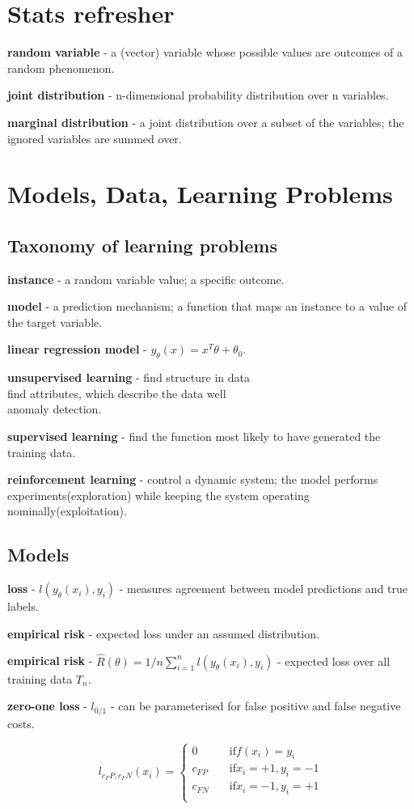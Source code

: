 \documentclass{article}
\newcommand{\para}[0]{\par\vspace{0.2cm}\noindent}
\newcommand{\define}[2]{\textbf{#1} - {#2}.  \para}
\begin{document}
\section{Stats refresher}
\define{random variable}
           {a (vector) variable whose possible values are outcomes of a random phenomenon}
\define{joint distribution}
           {n-dimensional probability distribution over n variables}
\define{marginal distribution}
           {a joint distribution over a subset of the variables; the ignored variables are summed over}


\section{Models, Data, Learning Problems}
\subsection{Taxonomy of learning problems}
\define{instance}
           {a random variable value; a specific outcome}
\define{model}
           {a prediction mechanism; a function that maps an instance to a value of the target variable}
\define{linear regression model}
           {$y_\theta(x) = x^T \theta + \theta_0$}
\define{unsupervised learning}
           {find structure in data  \\
            find attributes, which describe the data well  \\
            anomaly detection}
\define{supervised learning}
           {find the function most likely to have generated the training data}
\define{reinforcement learning}
           {control a dynamic system; the model performs experiments(exploration) while keeping the system operating nominally(exploitation)}


\subsection{Models}
\define{loss}
           {$l(y_\theta(x_i), y_i)$ - measures agreement between model predictions and true labels}
\define{empirical risk}
           {expected loss under an assumed distribution}
\define{empirical risk}
           {$\hat R(\theta) = 1/n \sum_{i=1}^n l(y_\theta(x_i), y_i)$ - expected loss over all training data $T_n$}
\define{zero-one loss}
           {$l_{0/1}$ - can be parameterised for false positive and false negative costs}
$$l_{c_FP, c_FN}(x_i) =
  \begin{cases}
    0         & \quad \mathrm{if } f(x_i) = y_i  \\
    c_{FP}    & \quad \mathrm{if } x_i = +1, y_i = -1  \\
    c_{FN}    & \quad \mathrm{if } x_i = -1, y_i = +1  \\
  \end{cases}$$
\end{document}
